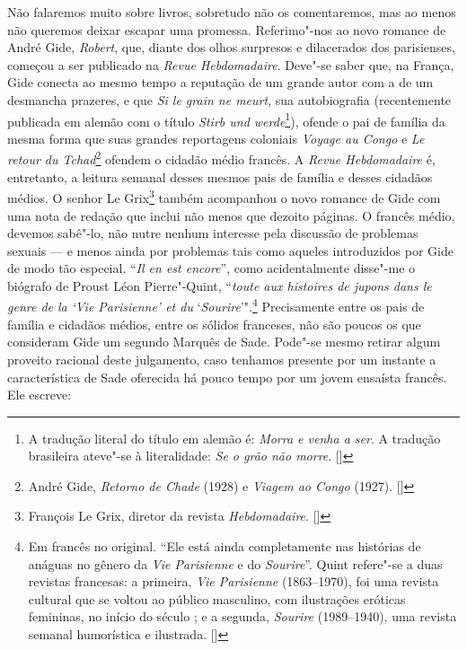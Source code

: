 Não falaremos muito sobre livros, sobretudo não os comentaremos, mas ao
menos não queremos deixar escapar uma promessa. Referimo"-nos ao novo
romance de André Gide, \emph{Robert}, que, diante dos olhos surpresos e
dilacerados dos parisienses, começou a ser publicado na \emph{Revue
Hebdomadaire}. Deve"-se saber que, na França, Gide conecta ao mesmo tempo
a reputação de um grande autor com a de um desmancha prazeres, e que
\emph{Si le grain ne meurt}, sua autobiografia (recentemente publicada
em alemão com o título \emph{Stirb und werde}\footnote{A tradução
  literal do título em alemão é: \emph{Morra e venha a ser}. A tradução
  brasileira ateve"-se à literalidade: \emph{Se o grão não morre}. []}),
ofende o pai de família da mesma forma que suas grandes reportagens
coloniais \emph{Voyage au Congo} e \emph{Le retour du Tchad}\footnote{André Gide, \emph{Retorno de Chade} (1928) e \emph{Viagem ao Congo} (1927). []} ofendem
o cidadão médio francês. A \emph{Revue Hebdomadaire} é, entretanto, a
leitura semanal desses mesmos pais de família e desses cidadãos médios. O
senhor Le Grix\footnote{‎François Le Grix, diretor da revista
  \emph{Hebdomadaire}. []} também acompanhou o novo romance de Gide com uma
nota de redação que inclui não menos que dezoito páginas. O francês
médio, devemos sabê"-lo, não nutre nenhum interesse pela discussão de
problemas sexuais --- e menos ainda por problemas tais como aqueles
introduzidos por Gide de modo tão especial. ``\emph{Il en est encore}'',
como acidentalmente disse"-me o biógrafo de Proust Léon Pierre"-Quint,
``\emph{toute aux histoires de jupons dans le genre de la} \emph{`Vie
Parisienne' et du} `\emph{Sourire}'".\footnote{Em francês no
  original. ``Ele está ainda completamente nas histórias de anáguas no
  gênero da \emph{Vie Parisienne} e do \emph{Sourire}''. Quint refere"-se a duas
  revistas francesas: a primeira, \emph{Vie Parisienne}
  (1863--1970), foi uma revista cultural que se voltou ao público
  masculino, com ilustrações eróticas femininas, no início do século ;
  e a segunda, \emph{Sourire} (1989--1940), uma revista semanal
  humorística e ilustrada. []} Precisamente entre os pais de família e
cidadãos médios, entre os sólidos franceses, não são poucos os que
consideram Gide um segundo Marquês de Sade. Pode"-se mesmo retirar algum
proveito racional deste julgamento, caso tenhamos presente por um
instante a característica de Sade oferecida há pouco tempo por um jovem
ensaísta francês. Ele escreve:


